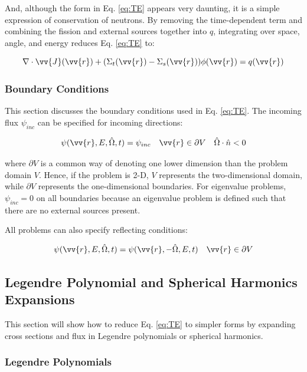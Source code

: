 \documentclass[10pt]{article}
\newcommand{\hO}{\hat{\Omega}}
\newcommand{\spa}{(\vv{r}, E, \hO, t)}
\begin{document}
\begin{flushleft}
And, although the form in Eq. \eqref{eq:TE} appears very daunting, it is a simple expression of conservation of neutrons. By removing the time-dependent term and combining the fission and external sources together into \(q\), integrating over space, angle, and energy reduces Eq. \eqref{eq:TE} to:

\begin{equation}
\nabla\cdot\vv{J}(\vv{r})+(\Sigma_t(\vv{r})-\Sigma_s(\vv{r}))\phi(\vv{r})=q(\vv{r})
\end{equation}

\subsubsection{Boundary Conditions}

This section discusses the boundary conditions used in Eq. \eqref{eq:TE}. The incoming flux \(\psi_{inc}\) can be specified for incoming directions:

\begin{equation}
\psi\spa =\psi_{inc}\quad\vv{r}\in \partial V\quad\hO  \cdot\hat{n}<0
\end{equation}

where \(\partial V\) is a common way of denoting one lower dimension than the problem domain \(V\). Hence, if the problem is 2-D, \(V\) represents the two-dimensional domain, while \(\partial V\) represents the one-dimensional boundaries. For eigenvalue problems, \(\psi_{inc}=0\) on all boundaries because an eigenvalue problem is defined such that there are no external sources present. 

All problems can also specify reflecting conditions:

\begin{equation}
\psi\spa =\psi(\vv{r},-\hO  ,E,t)\quad\vv{r}\in\partial V
\end{equation}

\subsection{Legendre Polynomial and Spherical Harmonics Expansions}
This section will show how to reduce Eq. \eqref{eq:TE} to simpler forms by expanding cross sections and flux in Legendre polynomials or spherical harmonics.

\subsubsection{Legendre Polynomials}


\end{flushleft}
\end{document}
